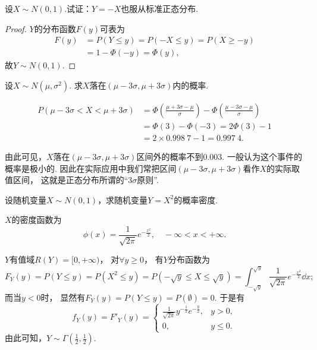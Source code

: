 \begin{example}
设\(X \sim N(0,1)\).试证：\(Y=-X\)也服从标准正态分布.
\begin{proof}
\(Y\)的分布函数\(F(y)\)可表为
\begin{align*}
	F(y) &= P(Y \leq y) = P(-X \leq y) = P(X \geq -y) \\
	&= 1 - \Phi(-y) = \Phi(y),
\end{align*}
故\(Y \sim N(0,1)\).
\end{proof}
\end{example}

\begin{example}
设\(X \sim N(\mu,\sigma^2)\).
求\(X\)落在\((\mu-3\sigma,\mu+3\sigma)\)内的概率.
\begin{solution}
\begin{align*}
	P(\mu-3\sigma<X<\mu+3\sigma)
	&= \Phi\left(\frac{\mu+3\sigma-\mu}{\sigma}\right)
	- \Phi\left(\frac{\mu-3\sigma-\mu}{\sigma}\right) \\
	&= \Phi(3) - \Phi(-3) = 2\Phi(3) - 1 \\
	&= 2 \times 0.998\ 7 - 1 = 0.997\ 4.
\end{align*}
\end{solution}
\end{example}
由此可见，\(X\)落在\((\mu-3\sigma,\mu+3\sigma)\)区间外的概率不到\(0.003\).
一般认为这个事件的概率是极小的.
因此在实际应用中我们常把区间\((\mu-3\sigma,\mu+3\sigma)\)看作\(X\)的实际取值区间，
这就是正态分布所谓的“\(3\sigma\)原则”.

\begin{example}
设随机变量\(X \sim N(0,1)\)，求随机变量\(Y = X^2\)的概率密度.
\begin{solution}
\(X\)的密度函数为\[
	\phi(x) = \frac{1}{\sqrt{2\pi}} e^{-\frac{x^2}{2}},
	\quad -\infty < x < +\infty.
\]

\(Y\)有值域\(R(Y) = [0,+\infty)\)，
对\(\forall y \geq 0\)，
有\(Y\)分布函数为\[
	F_Y(y) = P(Y \leq y) = P(X^2 \leq y)
	= P(-\sqrt{y} \leq X \leq \sqrt{y})
	= \int_{-\sqrt{y}}^{\sqrt{y}}{\frac{1}{\sqrt{2\pi}} e^{-\frac{x^2}{2}} \dd{x}};
\]
而当\(y < 0\)时，
显然有\(F_Y(y) = P(Y \leq y) = P(\emptyset) = 0\).
于是有\[
	f_Y(y)
	= F'_Y(y)
	= \left\{ \begin{array}{ll}
		\frac{1}{\sqrt{2\pi}} y^{-\frac{1}{2}} e^{-\frac{y}{2}}, & y > 0, \\
		0, & y \leq 0.
	\end{array} \right.
\]
由此可知，\(Y \sim \Gamma\left(\frac{1}{2},\frac{1}{2}\right)\).
\end{solution}
\end{example}

